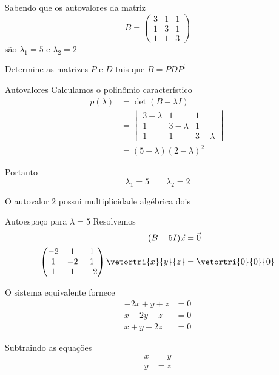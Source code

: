 \begin{question}
  Sabendo que os autovalores da matriz
  \[
    B =
    \begin{pmatrix}
      3 & 1 & 1 \\
      1 & 3 & 1 \\
      1 & 1 & 3
    \end{pmatrix}
  \]
  são
  \(
    \lambda_{1}=5
  \)
  e
  \(
    \lambda_{2}=2
  \)

  \bigskip
  Determine as matrizes $P$ e $D$ tais que
  \(
    B = P D P^t
  \)
\end{question}

\begin{resolution}{Autovalores}
  Calculamos o polinômio característico
  \begin{align*}
      p(\lambda)
      &=\det(B-\lambda I)\\
      &=
      \begin{vmatrix}
          3-\lambda & 1 & 1\\
          1 & 3-\lambda & 1\\
          1 & 1 & 3-\lambda
      \end{vmatrix}\\
      &=(5-\lambda)(2-\lambda)^2
  \end{align*}

  Portanto
  \[
      \lambda_{1}=5
      \qquad
      \lambda_{2}=2
  \]

  O autovalor $2$ possui multiplicidade algébrica dois
\end{resolution}

\begin{resolution}{Autoespaço para $\lambda=5$}
  Resolvemos
  \begin{align*}
      (B-5I)\vec{x}&=\vec{0}\\
      \begin{pmatrix}
          -2 & 1 & 1\\
          1 & -2 & 1\\
          1 & 1 & -2
      \end{pmatrix}
      \vetortri{x}{y}{z}
      &=\vetortri{0}{0}{0}
  \end{align*}

  O sistema equivalente fornece
  \begin{align*}
      -2x+y+z&=0\\
      x-2y+z&=0\\
      x+y-2z&=0
  \end{align*}

  Subtraindo as equações
  \begin{align*}
      x&=y\\
      y&=z
  \end{align*}
\end{resolution}

